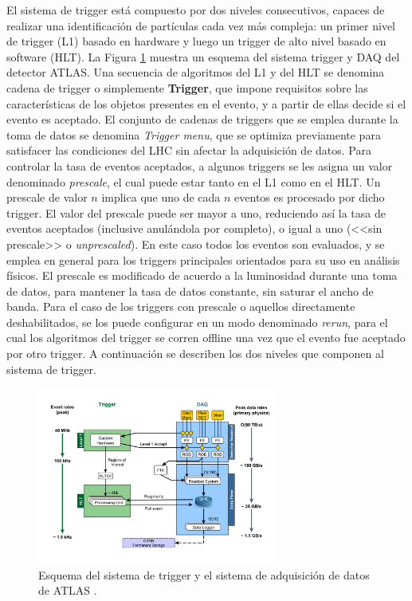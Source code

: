 El sistema de trigger está compuesto por dos niveles consecutivos, capaces de realizar una identificación de partículas cada vez más compleja: un primer nivel de trigger (L1) basado en hardware y luego un trigger de alto nivel basado en software (HLT). La Figura \ref{fig:tdaq} muestra un esquema del sistema trigger y DAQ del detector ATLAS. Una secuencia de algoritmos del L1 y del HLT se denomina cadena de trigger o simplemente \textbf{Trigger}, que impone requisitos sobre las características de los objetos presentes en el evento, y a partir de ellas decide si el evento es aceptado. El conjunto de cadenas de triggers que se emplea durante la toma de datos se denomina \textit{Trigger menu}, que se optimiza previamente para satisfacer las condiciones del LHC sin afectar la adquisición de datos. Para controlar la tasa de eventos aceptados, a algunos triggers se les asigna un valor denominado \textit{prescale}, el cual puede estar tanto en el L1 como en el HLT. Un prescale de valor $n$ implica que uno de cada $n$ eventos es procesado por dicho trigger. El valor del prescale puede ser mayor a uno, reduciendo así la tasa de eventos aceptados (inclusive anulándola por completo), o igual a uno (<<sin prescale>> o \textit{unprescaled}). En este caso todos los eventos son evaluados, y se emplea en general para los triggers principales orientados para su uso en análisis físicos. El prescale es modificado de acuerdo a la luminosidad durante una toma de datos, para mantener la tasa de datos constante, sin saturar el ancho de banda. Para el caso de los triggers con prescale o aquellos directamente deshabilitados, se los puede configurar en un modo denominado \textit{rerun}, para el cual los algoritmos del trigger se corren offline una vez que el evento fue aceptado por otro trigger. A continuación se describen los dos niveles que componen al sistema de trigger.

\begin{figure}
  \centering
  \includegraphics[width=0.7\textwidth]{images/lhc/tdaqFullNew2017.pdf}
  \caption{Esquema del sistema de trigger y el sistema de adquisición de datos de ATLAS \cite{tdaq_plot}.}
  \label{fig:tdaq}
\end{figure}

